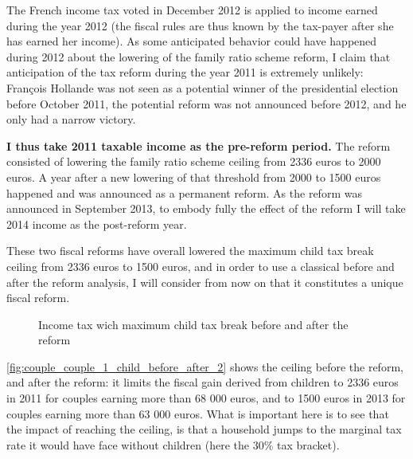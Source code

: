 The French income tax voted in December 2012 is applied to income earned during the year 2012 (the fiscal rules are thus known by the tax-payer after she has earned her income). As some anticipated behavior could have happened during 2012 about the lowering of the family ratio scheme reform, I claim that anticipation of the tax reform during the year 2011 is extremely unlikely: François Hollande was not seen as a potential winner of the presidential election before October 2011, the potential reform was not announced before 2012, and he only had a narrow victory.

\textbf{I thus take 2011 taxable income as the pre-reform period.} The reform consisted of lowering the family ratio scheme ceiling from 2336 euros to 2000 euros. A year after a new lowering of that threshold from 2000 to 1500 euros happened and was announced as a permanent reform. As the reform was announced in September 2013, to embody fully the effect of the reform I will take 2014 income as the post-reform year.

These two fiscal reforms have overall lowered the maximum child tax break ceiling from 2336 euros to 1500 euros, and in order to use a classical before and after the reform analysis, I will consider from now on that it constitutes a unique fiscal reform. 

  \begin{figure}[H]
      \caption{Income tax wich maximum child tax break before and after the reform}
      \label{fig:couple_couple_1_child_before_after_2}
  \end{figure}



\autoref{fig:couple_couple_1_child_before_after_2} shows the ceiling before the reform, and after the reform: it limits the fiscal gain derived from children to 2336 euros in 2011 for couples earning more than 68 000 euros, and to 1500 euros in 2013 for couples earning more than 63 000 euros.  What is important here is to see that the impact of reaching the ceiling, is that a household jumps to the marginal tax rate it would have face without children (here the 30\% tax bracket).




